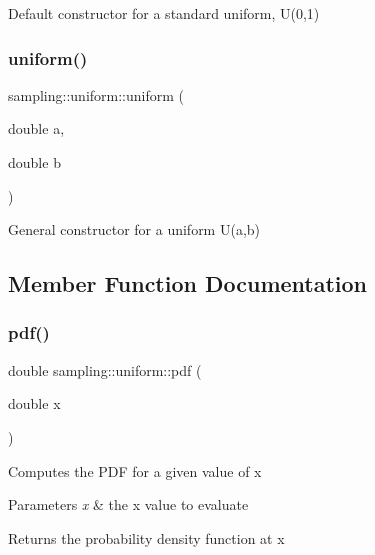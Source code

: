 Default constructor for a standard uniform, U(0,1) \mbox{\label{classsampling_1_1uniform_a67fa371e5e843209c83d584c33dd8957}} 
\subsubsection{\texorpdfstring{uniform()}{uniform()}\hspace{0.1cm}{\footnotesize\ttfamily [2/2]}}
{\footnotesize\ttfamily sampling\+::uniform\+::uniform (\begin{DoxyParamCaption}\item[{double}]{a,  }\item[{double}]{b }\end{DoxyParamCaption})}

General constructor for a uniform U(a,b) 

\subsection{Member Function Documentation}
\mbox{\label{classsampling_1_1uniform_a9fcb1597ca643fb1c2184f6febc69b0d}} 
\subsubsection{\texorpdfstring{pdf()}{pdf()}}
{\footnotesize\ttfamily double sampling\+::uniform\+::pdf (\begin{DoxyParamCaption}\item[{double}]{x }\end{DoxyParamCaption})}

Computes the P\+DF for a given value of x 
\begin{DoxyParams}{Parameters}
{\em x} & the x value to evaluate \\
\hline
\end{DoxyParams}
\begin{DoxyReturn}{Returns}
the probability density function at x 
\end{DoxyReturn}
\mbox{\label{classsampling_1_1uniform_a30fa2f2be90f2f9f2d46069540019fb4}} 
